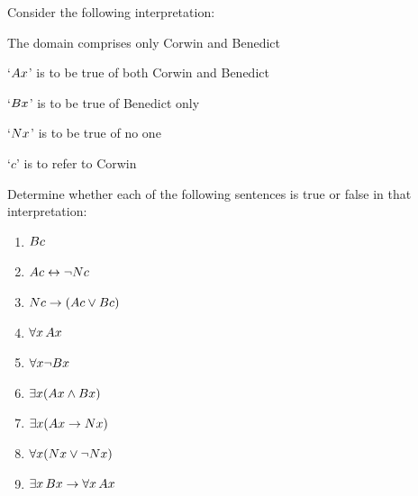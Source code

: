 \ockham

\practiceproblems
\problempart
\label{pr.TorF1}
Consider the following interpretation:
	\begin{ebullet}
		\item The domain comprises only Corwin and Benedict
		\item `$\mathord{A}x$' is to be true of both Corwin and Benedict
		\item `$\mathord{B}x$' is to be true of Benedict only
		\item `$\mathord{N}x$' is to be true of no one
		\item `$c$' is to refer to Corwin
	\end{ebullet}
Determine whether each of the following sentences is true or false in that interpretation:
\begin{enumerate}
\item $\mathord{B}c $
\item $\mathord{A}c  \leftrightarrow \neg \mathord{N}c$
\item $\mathord{N}c  \rightarrow (\mathord{A}c \vee \mathord{B}c)$
\item $\forall x\, \mathord{A}x$
\item $\forall x \neg \mathord{B}x$
\item $\exists x(\mathord{A}x \wedge \mathord{B}x)$
\item $\exists x(\mathord{A}x \rightarrow \mathord{N}x)$
\item $\forall x(\mathord{N}x \vee \neg \mathord{N}x)$
\item $\exists x\, \mathord{B}x \rightarrow \forall x\, \mathord{A}x$
\end{enumerate}

